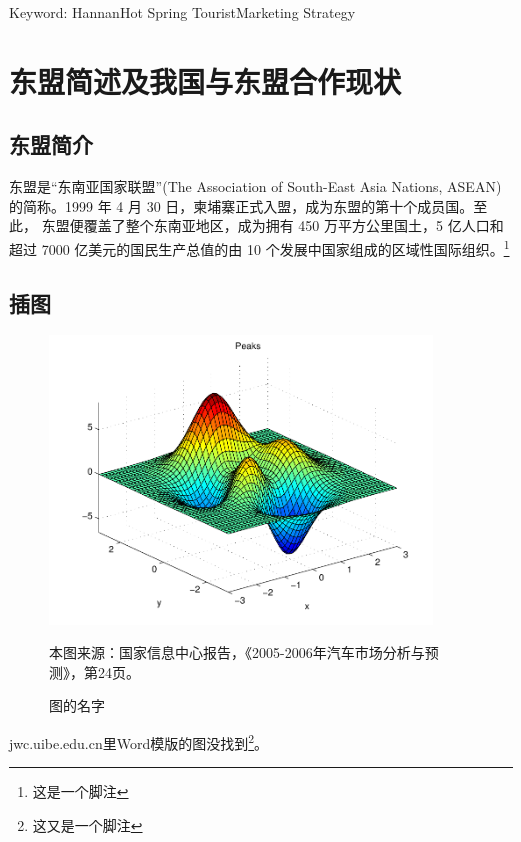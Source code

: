 \documentclass[12pt]{ctexart}
\begin{document}
\vspace{0.35cm}

Keyword: Hannan\quad Hot Spring Tourist\quad Marketing Strategy
\newpage
{}
\section{东盟简述及我国与东盟合作现状}
\subsection{东盟简介}
东盟是“东南亚国家联盟”(The Association of South-East Asia Nations, ASEAN)的简称。1999 年 4 月 30 日，柬埔寨正式入盟，成为东盟的第十个成员国。至此， 东盟便覆盖了整个东南亚地区，成为拥有 450 万平方公里国土，5 亿人口和超过 7000 亿美元的国民生产总值的由 10 个发展中国家组成的区域性国际组织。\footnote{这是一个脚注}
\subsection{插图}
\begin{figure}[H]
\begin{center}
\includegraphics[width=4in]{egpic.pdf}
\caption{图的名字}
\end{center}
本图来源：国家信息中心报告，《2005-2006年汽车市场分析与预测》，第24页。
\end{figure}
jwc.uibe.edu.cn里Word模版的图没找到\footnote{这又是一个脚注}。
\end{document}
